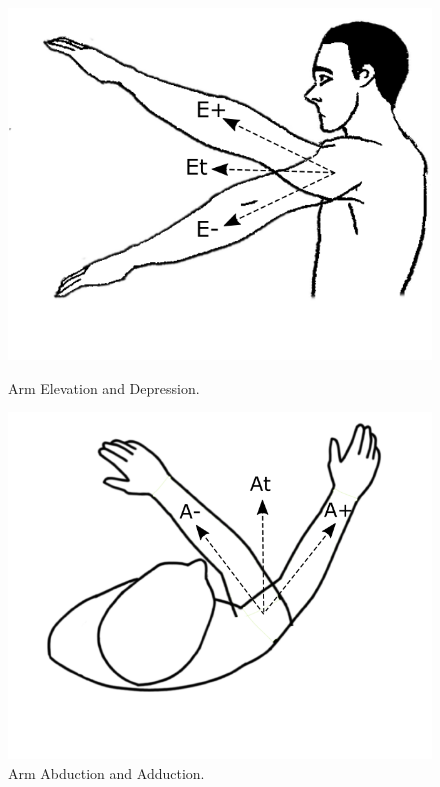 \begin{figure}[!t]
  \centering
  \includegraphics[width=0.8\linewidth]{imgs/approach/elevation_depression}
    \caption{Arm Elevation and Depression.}
    \label{fig:elevation_depression}
    \endminipage\hfill
{}
  \centering
  \includegraphics[width=0.8\linewidth]{imgs/approach/abduction_adduction}
    \caption{Arm Abduction and Adduction.}
    \label{fig:abduction_adduction}
    \endminipage
\end{figure}

